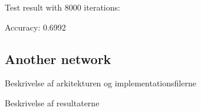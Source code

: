 Test result with 8000 iterations:

Accuracy: 0.6992


\subsection{Another network} %
\label{sub:another_network}

Beskrivelse af arkitekturen og implementationsfilerne

Beskrivelse af resultaterne

